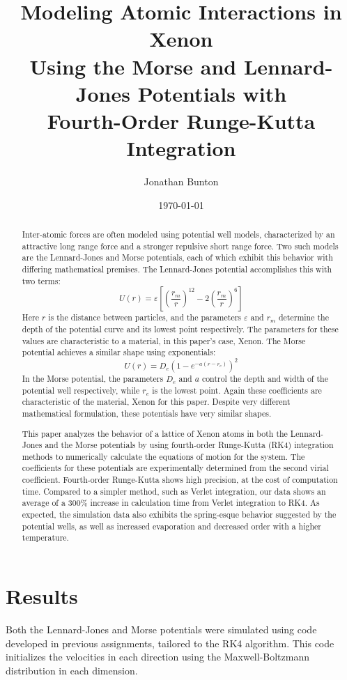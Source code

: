 \documentclass[12pt]{article}
\author{Jonathan Bunton}
\title{Modeling Atomic Interactions in Xenon \\ Using the Morse and Lennard-Jones Potentials with \\
Fourth-Order Runge-Kutta Integration}
\date{\today}
\begin{document}
\maketitle
\onehalfspacing
\begin{abstract}
Inter-atomic forces are often modeled using potential well models, characterized by an attractive long range force and a stronger repulsive short range force.   Two such models are the Lennard-Jones and Morse potentials, each of which exhibit this behavior with differing mathematical premises.  The Lennard-Jones potential accomplishes this with two terms:
\begin{equation*}
U(r) = \varepsilon\left[ \left( \frac{r_m}{r} \right)^{12}-2\left(\frac{r_m}{r}\right)^6\right]
\end{equation*}
Here $r$ is the distance between particles, and the parameters $\varepsilon$ and $r_m$ determine the depth of the potential curve and its lowest point respectively. \autocite{ljpotential} The parameters for these values are characteristic to a material, in this paper's case, Xenon.  The Morse potential achieves a similar shape using exponentials:
\begin{equation*}
U(r) = D_e \left(1-e^{-a(r-r_e)}\right)^2
\end{equation*}
In the Morse potential, the parameters $D_e$ and $a$ control the depth and width of the potential well respectively, while $r_e$ is the lowest point. \autocite{mpotential}  Again these coefficients are characteristic of the material, Xenon for this paper.   Despite very different mathematical formulation, these potentials have very similar shapes.

This paper analyzes the behavior of a lattice of Xenon atoms in both the Lennard-Jones and the Morse potentials by using fourth-order Runge-Kutta (RK4) integration methods to numerically calculate the equations of motion for the system. \autocite{rk4} The coefficients for these potentials are experimentally determined from the second virial coefficient. \autocite{mconstants, ljconstants}  Fourth-order Runge-Kutta shows high precision, at the cost of computation time.  Compared to a simpler method, such as Verlet integration, our data shows an average of a 300\% increase in calculation time from Verlet integration to RK4. 
As expected, the simulation data also exhibits the spring-esque behavior suggested by the potential wells, as well as increased evaporation and decreased order with a higher temperature.
\end{abstract}
\section*{Results}
Both the Lennard-Jones and Morse potentials were simulated using code developed in previous assignments, tailored to the RK4 algorithm.  This code initializes the velocities in each direction using the Maxwell-Boltzmann distribution in each dimension.  
\end{document}
